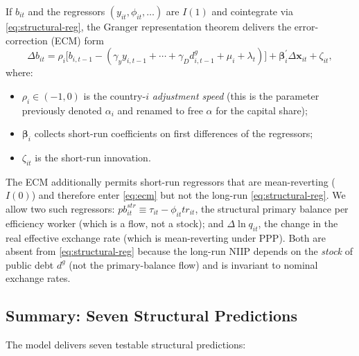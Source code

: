 If $b_{it}$ and the regressors $(y_{it},\phi_{it},\ldots)$ are $I(1)$ and
cointegrate via \eqref{eq:structural-reg}, the Granger representation theorem
\citep{EngleGranger1987} delivers the error-correction (ECM) form
\begin{equation}
\Delta b_{it}=\rho_i\bigl[b_{i,t-1}-(\gamma_y y_{i,t-1}+\cdots+\gamma_D d_{i,t-1}^g+\mu_i+\lambda_t)\bigr]+\boldsymbol\beta_i^{\prime}\Delta\mathbf x_{it}+\zeta_{it},
\label{eq:ecm}
\end{equation}
where:
\begin{itemize}[noitemsep]
\item $\rho_i\in(-1,0)$ is the country-$i$ \emph{adjustment speed} (this is
the parameter previously denoted $\alpha_i$ and renamed to free $\alpha$ for
the capital share);
\item $\boldsymbol\beta_i$ collects short-run coefficients on first differences
of the regressors;
\item $\zeta_{it}$ is the short-run innovation.
\end{itemize}
The ECM additionally permits short-run regressors that are mean-reverting
($I(0)$) and therefore enter \eqref{eq:ecm} but not the long-run
\eqref{eq:structural-reg}. We allow two such regressors:
$pb_{it}^{str}\equiv \tau_{it}-\phi_{it}tr_{it}$, the structural primary
balance per efficiency worker (which is a flow, not a stock); and
$\Delta\ln q_{it}$, the change in the real effective exchange rate (which is
mean-reverting under PPP). Both are absent from \eqref{eq:structural-reg}
because the long-run NIIP depends on the \emph{stock} of public debt $d^g$
(not the primary-balance flow) and is invariant to nominal exchange rates.

\subsection{Summary: Seven Structural Predictions}\label{sec:theory:summary}

The model delivers seven testable structural predictions:


